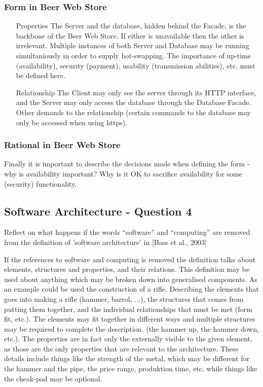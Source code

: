 \subsubsection{Form in Beer Web Store}
\begin{itemize}
    \item[Properties] The Server and the database, hidden behind the Facade, is the backbone of the Beer Web Store. If either is unavailable then the other is irrelevant. Multiple instances of both Server and Database may be running simultaniously in order to supply hot-swapping. The importance of up-time (availability), security (payment), usability (transmission abilities), etc. must be defined here.
    \item[Relationship] The Client may only see the server through its HTTP interface, and the Server may only access the database through the Database Facade. Other demands to the relationship (certain commands to the database may only be accessed when using https).
\end{itemize}

\subsubsection{Rational in Beer Web Store}

Finally it is important to describe the decisions made when defining the form - why is availability important? Why is it OK to sacrifice availability for some (security) functionality.

\subsection{Software Architecture - Question 4}

\begin{question}
Reflect on what happens if the words ``software'' and
``computing'' are removed from the definition of 'software
architecture' in [Bass et al., 2003]
\end{question}

If the references to software and computing is removed the definition talks about elements, structures and properties, and their relations. This definition may be used about anything which may be broken down into generalised components. As an example could be used the construction of a rifle. Describing the elements that goes into making a rifle (hammer, barrol, ...), the structures that comes from putting them together, and the individual relationships that must be met (form fit, etc.). The elements may fit together in different ways and multiple structures may be required to complete the description. (the hammer up, the hammer down, etc.). The properties are in fact only the externally visible to the given element, as those are the only properties that are relevant to the architecture. These details include things like the strength of the metal, which may be different for the hammer and the pipe, the price range, produktion time, etc. while things like the cheak-pad may be optional.

